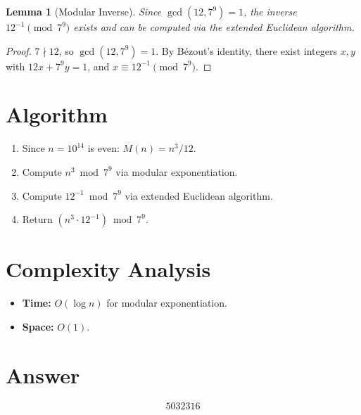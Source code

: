 \documentclass[12pt]{article}
\newtheorem{lemma}[theorem]{Lemma}
\begin{document}
\begin{lemma}[Modular Inverse]
Since $\gcd(12, 7^9) = 1$, the inverse $12^{-1} \pmod{7^9}$ exists and can be computed via the extended Euclidean algorithm.
\end{lemma}

\begin{proof}
$7 \nmid 12$, so $\gcd(12, 7^9) = 1$. By B\'{e}zout's identity, there exist integers $x, y$ with $12x + 7^9 y = 1$, and $x \equiv 12^{-1} \pmod{7^9}$.
\end{proof}

\section{Algorithm}

\begin{enumerate}
    \item Since $n = 10^{14}$ is even: $M(n) = n^3 / 12$.
    \item Compute $n^3 \bmod 7^9$ via modular exponentiation.
    \item Compute $12^{-1} \bmod 7^9$ via extended Euclidean algorithm.
    \item Return $(n^3 \cdot 12^{-1}) \bmod 7^9$.
\end{enumerate}

\section{Complexity Analysis}

\begin{itemize}
    \item \textbf{Time:} $O(\log n)$ for modular exponentiation.
    \item \textbf{Space:} $O(1)$.
\end{itemize}

\section{Answer}

\[
\boxed{5032316}
\]
\end{document}
